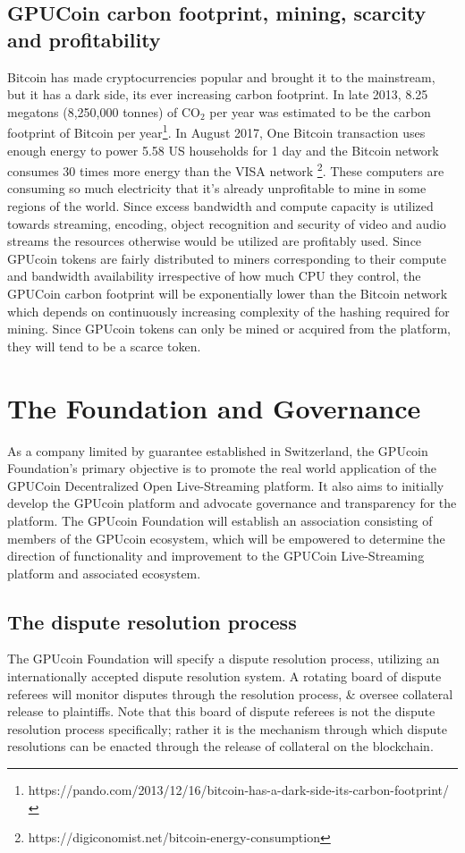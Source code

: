 \documentclass{article}
\begin{document}
\subsection{GPUCoin carbon footprint, mining, scarcity and profitability}
Bitcoin has made cryptocurrencies popular and brought it to the mainstream, but it has a dark side, its ever increasing carbon footprint. In late 2013, 8.25 megatons (8,250,000 tonnes) of CO$_2$ per year was estimated to be the carbon footprint of Bitcoin per year\footnote{https://pando.com/2013/12/16/bitcoin-has-a-dark-side-its-carbon-footprint/}. In August 2017, One Bitcoin transaction uses enough energy to power 5.58 US households for 1 day and the Bitcoin network consumes 30 times more energy than the VISA network \footnote{https://digiconomist.net/bitcoin-energy-consumption}. These computers are consuming so much electricity that it’s already unprofitable to mine in some regions of the world. Since excess bandwidth and compute capacity is utilized towards streaming, encoding, object recognition and security of video and audio streams the resources otherwise would be utilized are profitably used. Since GPUcoin tokens are fairly distributed to miners corresponding to their compute and bandwidth availability irrespective of how much CPU they control, the GPUCoin carbon footprint will be exponentially lower than the Bitcoin network which depends on continuously increasing complexity of the hashing required for mining. Since GPUcoin tokens can only be mined or acquired from the platform, they will tend to be a scarce token.

\section{The Foundation and Governance} %
\label{sec:the_foundation_and_governance}
As a company limited by guarantee established in Switzerland, the GPUcoin Foundation's primary objective is to promote the real world application of the GPUCoin Decentralized Open Live-Streaming platform. It also aims to initially develop the GPUcoin platform and advocate governance and transparency for the platform. The GPUcoin Foundation will establish an association consisting of members of the GPUcoin ecosystem, which will be empowered to determine the direction of functionality and improvement to the GPUCoin Live-Streaming platform and associated ecosystem.

\subsection{The dispute resolution process} %
\label{sub:the_dispute_resolution_process}
The GPUcoin Foundation will specify a dispute resolution process, utilizing an internationally accepted dispute resolution system. A rotating board of dispute referees will monitor disputes through the resolution process, \& oversee collateral release to plaintiffs. Note that this board of dispute referees is not the dispute resolution process specifically; rather it is the mechanism through which dispute resolutions can be enacted through the release of collateral on the blockchain.
\end{document}
